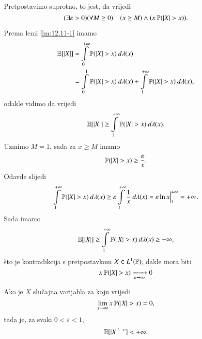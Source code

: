 \begin{rj}[\ref{zad:12.12}]
    Pretpostavimo suprotno, to jest, da vrijedi
    \begin{equation*}
        (\exists \varepsilon > 0)(\forall M \geq 0) \quad  (x \geq M ) \land (x \: \mathbb{P} (|X| > x)).
    \end{equation*}

    Prema lemi \ref{lm:12.11-1} imamo
    \begin{equation*}
        \begin{aligned}
            \mathbb{E} [|X|] &= \int\limits_{0}^{+\infty} \mathbb{P} (|X| > x) \: d \lambda (x)\\
            &= \int\limits_{0}^{1} \mathbb{P} (|X| > x) \: d \lambda (x) + \int\limits_{1}^{+\infty} \mathbb{P} (|X| > x) \: d \lambda (x),
        \end{aligned}
    \end{equation*}
    odakle vidimo da vrijedi
    \begin{equation*}
        \mathbb{E} [|X|] \geq \int\limits_{1}^{+\infty} \mathbb{P} (|X| > x) \: d \lambda (x).
    \end{equation*}
    Uzmimo $M = 1$, sada za $x \geq M$ imamo
    \begin{equation*}
        \mathbb{P} (|X| > x) \geq \frac{\varepsilon}{x}.
    \end{equation*}
    Odavde slijedi
    \begin{equation*}
        \int\limits_{1}^{+\infty} \mathbb{P} (|X| > x) \: d \lambda (x) \geq \varepsilon \int\limits_{1}^{+\infty} \frac{1}{x} \: d \lambda (x) = \varepsilon \ln x \Big|_{1}^{+\infty} = +\infty.
    \end{equation*}
    Sada imamo
    \begin{equation*}
        \mathbb{E} [|X|] \geq \int\limits_{1}^{+\infty} \mathbb{P} (|X| > x) \: d \lambda (x) \geq +\infty,
    \end{equation*}
    \v sto je kontradikcija s pretpostavkom $X \in L^1(\mathbb{P})$, dakle mora biti
    \begin{equation*}
        x \: \mathbb{P} (|X| > x) \xrightarrow[n \to \infty]{} 0
    \end{equation*}
\end{rj}

\begin{zad} \label{zad:12.13}
    Ako je $X$ slu\v cajna varijabla za koju vrijedi
    \begin{equation*}
        \lim\limits_{x \to \infty} x \: \mathbb{P}({|X| > x}) = 0,
    \end{equation*}
    tada je, za svaki $0 < \varepsilon < 1$,
    \begin{equation*}
        \mathbb{E} [ |X|^{1 - \varepsilon} ] < +\infty.
    \end{equation*}
\end{zad}


